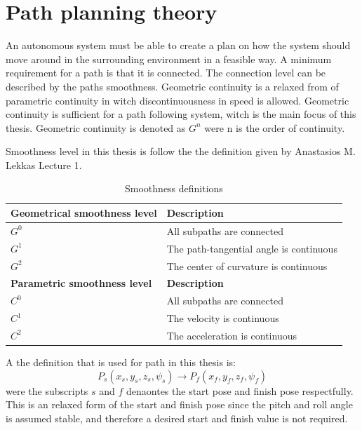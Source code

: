 \chapter{Path planning theory}
An autonomous system must be able to create a plan on how the system should move around in the surrounding environment in a feasible way. A minimum requirement for a path is that it is connected. The connection level can be described by the paths smoothness. Geometric continuity is a relaxed from of parametric continuity in witch discontinuousness in speed is allowed. Geometric continuity is sufficient for a path following system, witch is the main focus of this thesis. Geometric continuity is denoted as $G^n$ were n is the order of continuity.

Smoothness level in this thesis is follow the the definition given by Anastasios M. Lekkas Lecture 1.

\begin{table}[H]
\begin{center}
\begin{tabular}{| l | | l |}
\hline
\textbf{Geometrical smoothness level} & \textbf{Description} \\ \hline
$G^0$ & All subpaths are connected \\ \hline
$G^1$ & The path-tangential angle is continuous \\ \hline
$G^2$ & The center of curvature is continuous \\ \hline
\textbf{Parametric smoothness level} & \textbf{Description} \\ \hline
$C^0$ & All subpaths are connected \\ \hline
$C^1$ & The velocity is continuous \\ \hline
$C^2$ & The acceleration is continuous \\ \hline
\end{tabular}
\end{center}
\caption{Smoothness definitions}
\label{TB:SmoothnessDescriptions}
\end{table} 

A the definition that is used for path in this thesis is:
\begin{equation}
P_s(x_s,y_s,z_s,\psi_s) \rightarrow P_f(x_f,y_f,z_f,\psi_f)
\end{equation}
were the subscripts $s$ and $f$ denaontes the start pose and finish pose respectfully. This is an relaxed form of the start and finish pose since the pitch and roll angle is assumed stable, and therefore a desired start and finish value is not required.

